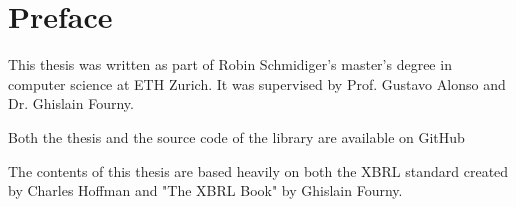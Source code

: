 \chapter{Preface}

This thesis was written as part of Robin Schmidiger's master's degree in computer science at ETH Zurich.
It was supervised by Prof. Gustavo Alonso and Dr. Ghislain Fourny.

Both the thesis and the source code of the library are available on GitHub\cite{brel_source}

The contents of this thesis are based heavily on both the XBRL standard\cite{xbrl} created by Charles Hoffman and "The XBRL Book"\cite{fourny2023xbrl} by Ghislain Fourny.